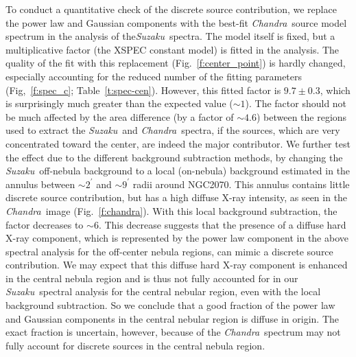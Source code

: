 \documentclass[usenatbib]{mnras}
\def\suzaku{{\sl Suzaku}}
\def\chandra{{\sl Chandra}}
\begin{document}
To conduct a quantitative check of the discrete source contribution, we replace the power law and Gaussian components with the best-fit \chandra\ source model spectrum in the analysis of the\suzaku\ spectra. The model itself is fixed, but a multiplicative factor (the XSPEC constant model) is fitted in the analysis. The quality of the fit with this replacement  (Fig.~\ref{f:center_point}) is hardly changed, especially accounting for  the reduced number of the fitting parameters  (Fig,~\ref{f:spec_c}; Table~\ref{t:spec-cen}). However, this fitted factor is $9.7\pm0.3$, which is surprisingly much greater than the expected value ($\sim 1$). The factor should not be much affected by the area difference  (by a factor of $\sim4.6$)  between the regions used to extract the \suzaku\ and \chandra\ spectra, if the sources, which are very concentrated toward the center, are indeed the major contributor. We further test the effect due to the different  background subtraction methods, by changing the \suzaku\ off-nebula background to a local (on-nebula) background estimated in the annulus between $\sim2^{\prime}$ and $\sim9^{\prime}$ radii around NGC2070. This annulus contains little discrete source contribution, but has a high diffuse X-ray intensity, as seen in the \chandra\ image (Fig.~\ref{f:chandra}).  
With this local background subtraction, the factor decreases to $\sim 6$. This decrease suggests that the presence of a diffuse hard X-ray component, which is represented by the power law component in the above spectral analysis for the off-center nebula regions, can mimic a discrete source contribution. We may expect that this diffuse hard X-ray component is enhanced in the central nebula region and is thus not fully accounted for in our \suzaku\ spectral analysis for the central nebular region, even with the local background subtraction. So we conclude that a good fraction of the power law and Gaussian components in the central nebular region is diffuse in origin. The exact fraction is uncertain, however, because of the \chandra\ spectrum may not fully account for discrete sources in the central nebula region.
\end{document}
